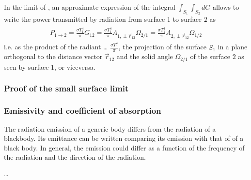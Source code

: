 \documentclass[letterpaper,10pt,english]{jupyterBook}
\begin{document}
\sphinxAtStartPar
In the limit of , an approximate expression of the integral \(\int_{S_1} \int_{S_2} d G\) allows to write the power transmitted by radiation from surface \(1\) to surface \(2\) as
\begin{equation*}
\begin{split}\begin{aligned}
  P_{1 \rightarrow 2} = \frac{\sigma T_1^4}{\pi} G_{12} 
    = \frac{\sigma T_1^4}{\pi} A_{1, \perp \vec{r}_{12}} \Omega_{2/1}
    = \frac{\sigma T_1^4}{\pi} A_{2, \perp \vec{r}_{12}} \Omega_{1/2}
\end{aligned}\end{split}
\end{equation*}
\sphinxAtStartPar
i.e. as the product of the radiant …   \(\frac{\sigma T_1^4}{\pi}\), the projection of the surface \(S_{1}\) in a plane orthogonal to the distance vector \(\vec{r}_{12}\) and the solid angle \(\Omega_{2/1}\) of the surface \(2\) as seen by surface \(1\), or viceversa.
\subsubsection*{Proof of the small surface limit}


\subsubsection{Emissivity and coefficient of absorption}
\label{\detokenize{ch/heat-transfer-radiation:emissivity-and-coefficient-of-absorption}}\label{\detokenize{ch/heat-transfer-radiation:classical-thermodynamics-heat-transmission-radiation-emittivity}}
\sphinxAtStartPar
The radiation emission of a generic body differs from the radiation of a black\sphinxhyphen{}body. Its emittance can be written comparing its emission with that of of a black body. In general, the emission could differ as a function of the frequency of the radiation and the direction of the radiation.

\sphinxAtStartPar
…
\end{document}
